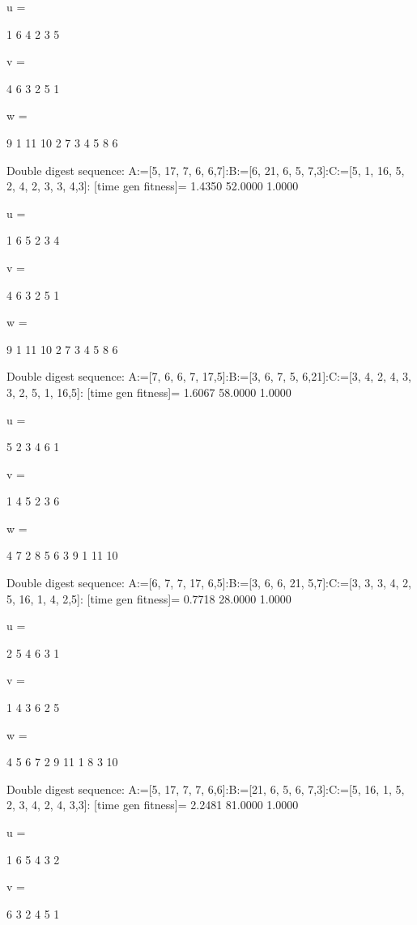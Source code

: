 u =

     1     6     4     2     3     5


v =

     4     6     3     2     5     1


w =

     9     1    11    10     2     7     3     4     5     8     6

Double digest sequence:
A:=[5, 17, 7, 6, 6,7]:B:=[6, 21, 6, 5, 7,3]:C:=[5, 1, 16, 5, 2, 4, 2, 3, 3, 4,3]:
[time gen fitness]=
    1.4350   52.0000    1.0000


u =

     1     6     5     2     3     4


v =

     4     6     3     2     5     1


w =

     9     1    11    10     2     7     3     4     5     8     6

Double digest sequence:
A:=[7, 6, 6, 7, 17,5]:B:=[3, 6, 7, 5, 6,21]:C:=[3, 4, 2, 4, 3, 3, 2, 5, 1, 16,5]:
[time gen fitness]=
    1.6067   58.0000    1.0000


u =

     5     2     3     4     6     1


v =

     1     4     5     2     3     6


w =

     4     7     2     8     5     6     3     9     1    11    10

Double digest sequence:
A:=[6, 7, 7, 17, 6,5]:B:=[3, 6, 6, 21, 5,7]:C:=[3, 3, 3, 4, 2, 5, 16, 1, 4, 2,5]:
[time gen fitness]=
    0.7718   28.0000    1.0000


u =

     2     5     4     6     3     1


v =

     1     4     3     6     2     5


w =

     4     5     6     7     2     9    11     1     8     3    10

Double digest sequence:
A:=[5, 17, 7, 7, 6,6]:B:=[21, 6, 5, 6, 7,3]:C:=[5, 16, 1, 5, 2, 3, 4, 2, 4, 3,3]:
[time gen fitness]=
    2.2481   81.0000    1.0000


u =

     1     6     5     4     3     2


v =

     6     3     2     4     5     1



